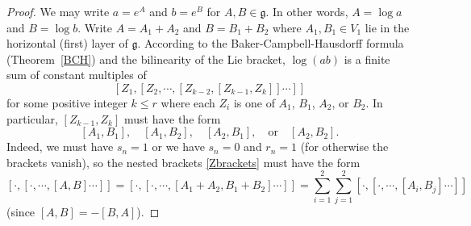 \documentclass[11pt]{amsart}
\theoremstyle{definition}
\numberwithin{theorem}{section} \numberwithin{equation}{section}
\begin{document}
\begin{proof}
We may write $a = e^A$ and $b=e^B$ for $A,B \in \mathfrak{g}$.
In other words, $A = \log a$ and $B = \log b$.
Write $A=A_1+A_2$ and $B=B_1+B_2$ where $A_1,B_1 \in V_1$ lie in the horizontal (first) layer of $\mathfrak{g}$.
According to the Baker-Campbell-Hausdorff formula (Theorem~\ref{BCH})
and the bilinearity of the Lie bracket, 
$\log (ab)$ is a finite sum of constant multiples of 
\begin{equation}
\label{Zbrackets}
[Z_1,[Z_2,\cdots,[Z_{k-2},[Z_{k-1},Z_k]]\cdots]]
\end{equation}
for some positive integer $k \leq r$ where each 
$Z_i$ is one of $A_1$, $B_1$, $A_2$, or $B_2$.
In particular, $[Z_{k-1},Z_k]$ must have the form
\begin{equation}
\label{brackets}
[A_1,B_1], \quad [A_1,B_2], \quad [A_2,B_1], \quad \text{or} \quad [A_2,B_2].
\end{equation}
Indeed,
we must have $s_n = 1$ or we have $s_n = 0$ and $r_n  = 1$
(for otherwise the brackets vanish),
so the nested brackets \eqref{Zbrackets} must have the form
$$
[\cdot,[\cdot,\cdots,[A,B]\cdots]] = [\cdot,[\cdot,\cdots,[A_1+A_2,B_1+B_2]\cdots]] = \sum_{i=1}^2 \sum_{j=1}^2 [\cdot,[\cdot,\cdots,[A_i,B_j]\cdots]]
$$
(since $[A,B]=-[B,A]$).


\end{proof}
\end{document}
